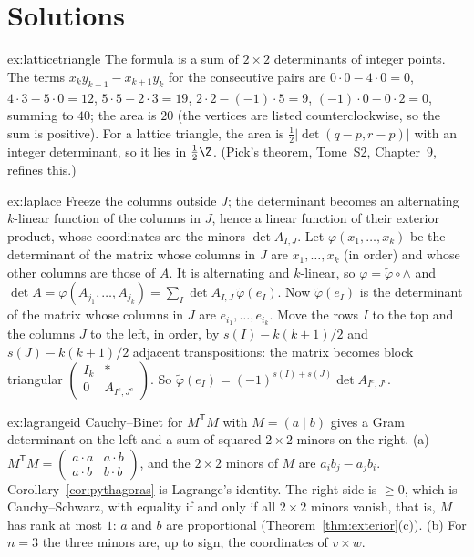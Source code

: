 \section{Solutions}

\begin{solution}{ex:latticetriangle}
\idea The formula is a sum of $2\times2$ determinants of integer points.
\writeup The terms $x_ky_{k+1}-x_{k+1}y_k$ for the consecutive pairs are $0\cdot0-4\cdot0=0$, $4\cdot3-5\cdot0=12$,
$5\cdot5-2\cdot3=19$, $2\cdot2-(-1)\cdot5=9$, $(-1)\cdot0-0\cdot2=0$, summing to $40$; the area is $20$ (the vertices are listed
counterclockwise, so the sum is positive). For a lattice triangle, the area is $\frac12|\det(q-p,r-p)|$ with an integer
determinant, so it lies in $\frac12\Z$. (Pick's theorem, Tome~S2, Chapter~9, refines this.)
\end{solution}

\begin{solution}{ex:laplace}
\idea Freeze the columns outside $J$; the determinant becomes an alternating $k$-linear function of the columns in $J$,
hence a linear function of their exterior product, whose coordinates are the minors $\det A_{I,J}$.
\writeup Let $\varphi(x_1,\dots,x_k)$ be the determinant of the matrix whose columns in $J$ are $x_1,\dots,x_k$ (in order) and
whose other columns are those of $A$. It is alternating and $k$-linear, so $\varphi=\tilde\varphi\circ\wedge$ and
$\det A=\varphi(A_{j_1},\dots,A_{j_k})=\sum_I\det A_{I,J}\,\tilde\varphi(e_I)$. Now $\tilde\varphi(e_I)$ is the determinant of the matrix
whose columns in $J$ are $e_{i_1},\dots,e_{i_k}$. Move the rows $I$ to the top and the columns $J$ to the left, in order, by
$s(I)-k(k+1)/2$ and $s(J)-k(k+1)/2$ adjacent transpositions: the matrix becomes block triangular
$\begin{pmatrix}I_k&*\\0&A_{I^c,J^c}\end{pmatrix}$. So $\tilde\varphi(e_I)=(-1)^{s(I)+s(J)}\det A_{I^c,J^c}$.
\end{solution}

\begin{solution}{ex:lagrangeid}
\idea Cauchy--Binet for $M^{\mathsf T}M$ with $M=(a\mid b)$ gives a Gram determinant on the left and a sum of squared
$2\times2$ minors on the right.
\writeup (a) $M^{\mathsf T}M=\begin{pmatrix}a\cdot a&a\cdot b\\a\cdot b&b\cdot b\end{pmatrix}$, and the $2\times2$ minors of $M$ are
$a_ib_j-a_jb_i$. Corollary~\ref{cor:pythagoras} is Lagrange's identity. The right side is $\ge0$, which is Cauchy--Schwarz,
with equality if and only if all $2\times2$ minors vanish, that is, $M$ has rank at most $1$: $a$ and $b$ are proportional
(Theorem~\ref{thm:exterior}(c)). (b) For $n=3$ the three minors are, up to sign, the coordinates of $v\times w$.
\end{solution}

